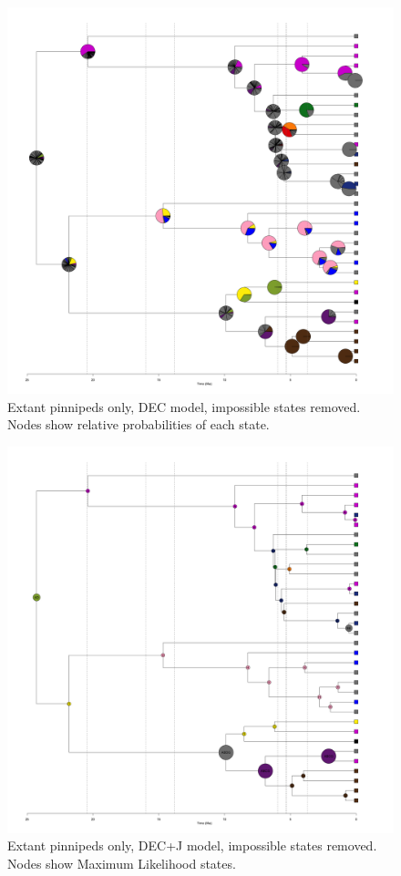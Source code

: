 \documentclass[a4paper, 12pt]{article}
\begin{document}
\begin{figure}[H]
 \centering
  \includegraphics[width = \linewidth]{figures/extant-pinnipeds-DEC-impossible-pies.png}
  \caption{Extant pinnipeds only, DEC model, impossible states removed. Nodes show relative probabilities of each state.}
  \label{fig-extant-dec-pie}
\end{figure} 

\begin{figure}[H]
 \centering
  \includegraphics[width = \linewidth]{figures/extant-pinnipeds-DECj-impossible-MLstates.png}
  \caption{Extant pinnipeds only, DEC+J model, impossible states removed. Nodes show Maximum Likelihood states.}
  \label{fig-extant-decj-ml}
\end{figure} 
\end{document}

